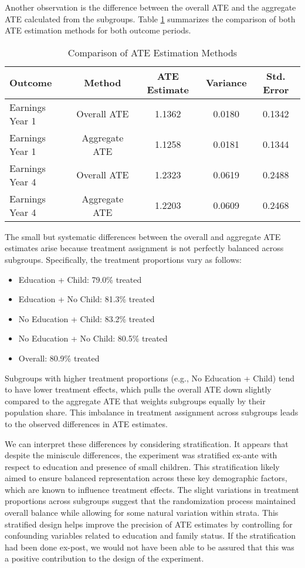 \documentclass[12pt]{article}
\begin{document}
Another observation is the difference between the overall ATE and the aggregate ATE calculated from the subgroups. Table \ref{tab:comparison_results} summarizes the comparison of both ATE estimation methods for both outcome periods.

\begin{table}[h]
\centering
\caption{Comparison of ATE Estimation Methods}
\label{tab:comparison_results}
\begin{tabular}{lcccc}
\hline
\textbf{Outcome} & \textbf{Method} & \textbf{ATE Estimate} & \textbf{Variance} & \textbf{Std. Error} \\
\hline
Earnings Year 1 & Overall ATE & 1.1362 & 0.0180 & 0.1342 \\
Earnings Year 1 & Aggregate ATE & 1.1258 & 0.0181 & 0.1344 \\
Earnings Year 4 & Overall ATE & 1.2323 & 0.0619 & 0.2488 \\
Earnings Year 4 & Aggregate ATE & 1.2203 & 0.0609 & 0.2468 \\
\hline
\end{tabular}
\end{table}

The small but systematic differences between the overall and aggregate ATE estimates arise because treatment assignment is not perfectly balanced across subgroups. Specifically, the treatment proportions vary as follows:
\begin{itemize}
    \item Education + Child: 79.0\% treated
    \item Education + No Child: 81.3\% treated  
    \item No Education + Child: 83.2\% treated
    \item No Education + No Child: 80.5\% treated
    \item Overall: 80.9\% treated
\end{itemize}

Subgroups with higher treatment proportions (e.g., No Education + Child) tend to have lower treatment effects, which pulls the overall ATE down slightly compared to the aggregate ATE that weights subgroups equally by their population share. This imbalance in treatment assignment across subgroups leads to the observed differences in ATE estimates.

We can interpret these differences by considering stratification. It appears that despite the miniscule differences, the experiment was stratified ex-ante with respect to education and presence of small children. This stratification likely aimed to ensure balanced representation across these key demographic factors, which are known to influence treatment effects. The slight variations in treatment proportions across subgroups suggest that the randomization process maintained overall balance while allowing for some natural variation within strata. This stratified design helps improve the precision of ATE estimates by controlling for confounding variables related to education and family status. If the stratification had been done ex-post, we would not have been able to be assured that this was a positive contribution to the design of the experiment.
\end{document}
